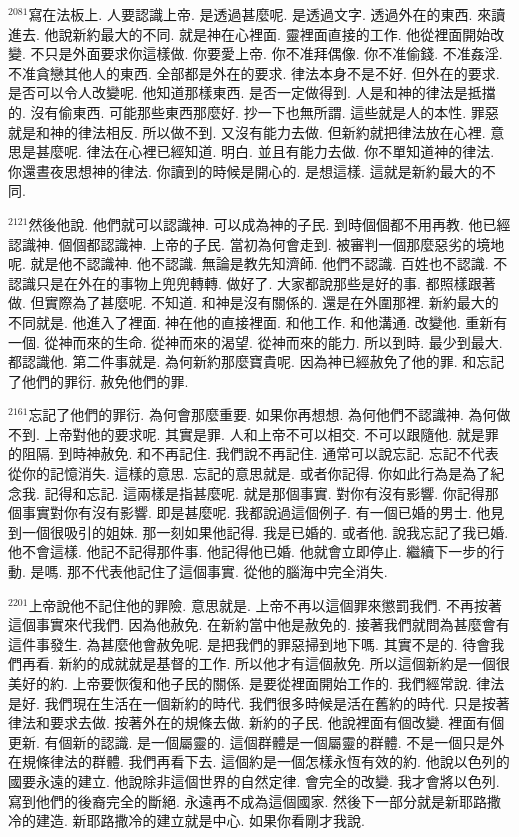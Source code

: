 \documentclass{book}
\begin{document}
$^{2081}$寫在法板上.
人要認識上帝.
是透過甚麼呢.
是透過文字.
透過外在的東西.
來讀進去.
他說新約最大的不同.
就是神在心裡面.
靈裡面直接的工作.
他從裡面開始改變.
不只是外面要求你這樣做.
你要愛上帝.
你不准拜偶像.
你不准偷錢.
不准姦淫.
不准貪戀其他人的東西.
全部都是外在的要求.
律法本身不是不好.
但外在的要求.
是否可以令人改變呢.
他知道那樣東西.
是否一定做得到.
人是和神的律法是抵擋的.
沒有偷東西.
可能那些東西那麼好.
抄一下也無所謂.
這些就是人的本性.
罪惡就是和神的律法相反.
所以做不到.
又沒有能力去做.
但新約就把律法放在心裡.
意思是甚麼呢.
律法在心裡已經知道.
明白.
並且有能力去做.
你不單知道神的律法.
你還晝夜思想神的律法.
你讀到的時候是開心的.
是想這樣.
這就是新約最大的不同.

$^{2121}$然後他說.
他們就可以認識神.
可以成為神的子民.
到時個個都不用再教.
他已經認識神.
個個都認識神.
上帝的子民.
當初為何會走到.
被審判一個那麼惡劣的境地呢.
就是他不認識神.
他不認識.
無論是教先知濟師.
他們不認識.
百姓也不認識.
不認識只是在外在的事物上兜兜轉轉.
做好了.
大家都說那些是好的事.
都照樣跟著做.
但實際為了甚麼呢.
不知道.
和神是沒有關係的.
還是在外圍那裡.
新約最大的不同就是.
他進入了裡面.
神在他的直接裡面.
和他工作.
和他溝通.
改變他.
重新有一個.
從神而來的生命.
從神而來的渴望.
從神而來的能力.
所以到時.
最少到最大.
都認識他.
第二件事就是.
為何新約那麼寶貴呢.
因為神已經赦免了他的罪.
和忘記了他們的罪衍.
赦免他們的罪.

$^{2161}$忘記了他們的罪衍.
為何會那麼重要.
如果你再想想.
為何他們不認識神.
為何做不到.
上帝對他的要求呢.
其實是罪.
人和上帝不可以相交.
不可以跟隨他.
就是罪的阻隔.
到時神赦免.
和不再記住.
我們說不再記住.
通常可以說忘記.
忘記不代表從你的記憶消失.
這樣的意思.
忘記的意思就是.
或者你記得.
你如此行為是為了紀念我.
記得和忘記.
這兩樣是指甚麼呢.
就是那個事實.
對你有沒有影響.
你記得那個事實對你有沒有影響.
即是甚麼呢.
我都說過這個例子.
有一個已婚的男士.
他見到一個很吸引的姐妹.
那一刻如果他記得.
我是已婚的.
或者他.
說我忘記了我已婚.
他不會這樣.
他記不記得那件事.
他記得他已婚.
他就會立即停止.
繼續下一步的行動.
是嗎.
那不代表他記住了這個事實.
從他的腦海中完全消失.

$^{2201}$上帝說他不記住他的罪險.
意思就是.
上帝不再以這個罪來懲罰我們.
不再按著這個事實來代我們.
因為他赦免.
在新約當中他是赦免的.
接著我們就問為甚麼會有這件事發生.
為甚麼他會赦免呢.
是把我們的罪惡掃到地下嗎.
其實不是的.
待會我們再看.
新約的成就就是基督的工作.
所以他才有這個赦免.
所以這個新約是一個很美好的約.
上帝要恢復和他子民的關係.
是要從裡面開始工作的.
我們經常說.
律法是好.
我們現在生活在一個新約的時代.
我們很多時候是活在舊約的時代.
只是按著律法和要求去做.
按著外在的規條去做.
新約的子民.
他說裡面有個改變.
裡面有個更新.
有個新的認識.
是一個屬靈的.
這個群體是一個屬靈的群體.
不是一個只是外在規條律法的群體.
我們再看下去.
這個約是一個怎樣永恆有效的約.
他說以色列的國要永遠的建立.
他說除非這個世界的自然定律.
會完全的改變.
我才會將以色列.
寫到他們的後裔完全的斷絕.
永遠再不成為這個國家.
然後下一部分就是新耶路撒冷的建造.
新耶路撒冷的建立就是中心.
如果你看剛才我說.
\end{document}
